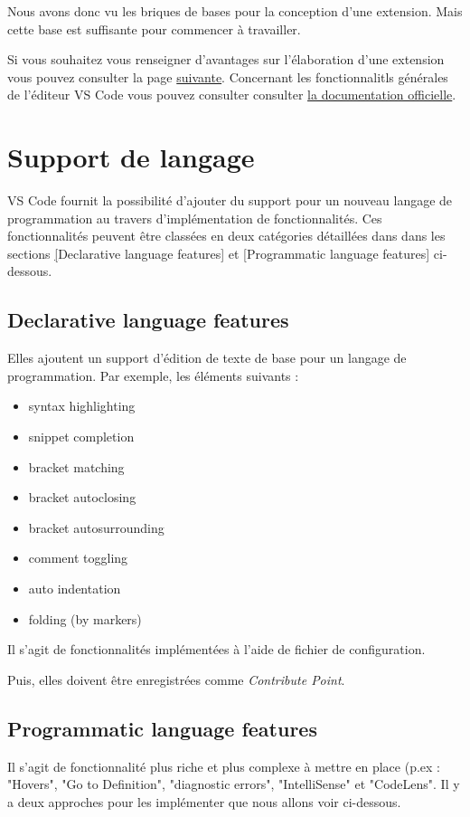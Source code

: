\documentclass[
    iict, %
    il, %
]{heig-tb}
\begin{document}
Nous avons donc vu les briques de bases pour la conception d'une extension. Mais cette base est suffisante pour commencer à travailler.

Si vous souhaitez vous renseigner d'avantages sur l'élaboration d'une extension vous pouvez consulter la page \href{https://code.visualstudio.com/api}{suivante}.
Concernant les fonctionnalitls générales de l'éditeur VS Code vous pouvez consulter consulter \href{https://code.visualstudio.com/docs}{la documentation officielle}.

\section{Support de langage}
VS Code fournit la possibilité d'ajouter du support pour un nouveau langage de programmation au travers d'implémentation de fonctionnalités. Ces fonctionnalités peuvent être classées en deux catégories détaillées
dans dans les sections \hyperref[Declarative language features][Declarative language features] et \hyperref[Programmatic language features][Programmatic language features] ci-dessous.

\subsection{Declarative language features}\label{Declarative language features}
Elles ajoutent un support d'édition de texte de base pour un langage de programmation.
Par exemple, les éléments suivants :

\begin{itemize}
    \item syntax highlighting
    \item snippet completion
    \item bracket matching
    \item bracket autoclosing
    \item bracket autosurrounding
    \item comment toggling
    \item auto indentation
    \item folding (by markers)
\end{itemize}

Il s'agit de fonctionnalités implémentées à l'aide de fichier de configuration.

Puis, elles doivent être enregistrées comme \emph{Contribute Point}.

\subsection{Programmatic language features}\label{Programmatic language features}
Il s'agit de fonctionnalité plus riche et plus complexe à mettre en place (p.ex : "Hovers", "Go to Definition", "diagnostic errors", "IntelliSense" \space et "CodeLens".
Il y a deux approches pour les implémenter que nous allons voir ci-dessous.
\end{document}
